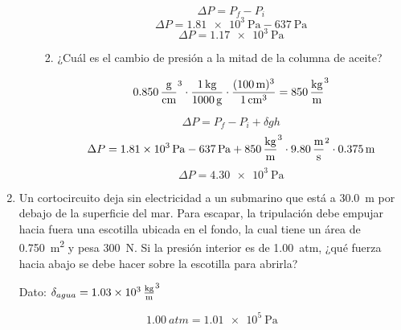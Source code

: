 \documentclass[Física - Práctica.root.tex]{subfiles}
\begin{document}
\begin{enumerate}
\begin{enumerate}
\begin{enumerate}
                        \[\Delta P=P_f-P_i\]
                        \[\Delta P=\SI{1,81e3}{\pascal}-\SI{637}{\pascal}\]
                        \[\Delta P=\boxed{\SI{1,17e3}{\pascal}}\]

                  \item ¿Cuál es el cambio de presión a la mitad de la columna de aceite?

                        \[\SI{0,850}{\gram\over\centi\meter\cubed}\cdot\frac{\SI{1}{\kilogram}}{\SI{1000}{\gram}}\cdot\frac{(\SI{100}{\meter})^3}{\SI{1}{\cm\cubed}}=\SI{850}{\kilogram\over\meter\cubed}\]

                        \[\Delta P=P_f-P_i+\delta gh\]
                        \[\Delta P=\SI{1,81e3}{\pascal}-\SI{637}{\pascal}+\SI{850}{\kilogram\over\meter\cubed}\cdot\SI{9,80}{\meter\over\second\squared}\cdot\SI{0,375}{\meter}\]
                        \[\Delta P=\boxed{\SI{4,30e3}{\pascal}}\]
                \end{enumerate}
        \end{enumerate}

  \item Un cortocircuito deja sin electricidad a un submarino que está a \SI{30,0}{\meter} por debajo de la superficie del mar. Para escapar, la tripulación debe empujar hacia fuera una escotilla ubicada en el fondo, la cual tiene un área de \SI{0,750}{\meter\squared} y pesa \SI{300}{\newton}. Si la presión interior es de \SI{1,00}{atm}, ¿qué fuerza hacia abajo se debe hacer sobre la escotilla para abrirla?

        Dato: $\delta_{agua}=\SI{1,03e3}{\kilogram\over\meter\cubed}$

        \begin{center}
        \end{center}

        \[\SI{1,00}{atm}=\SI{1,01e5}{\pascal}\]


\end{enumerate}
\end{document}

